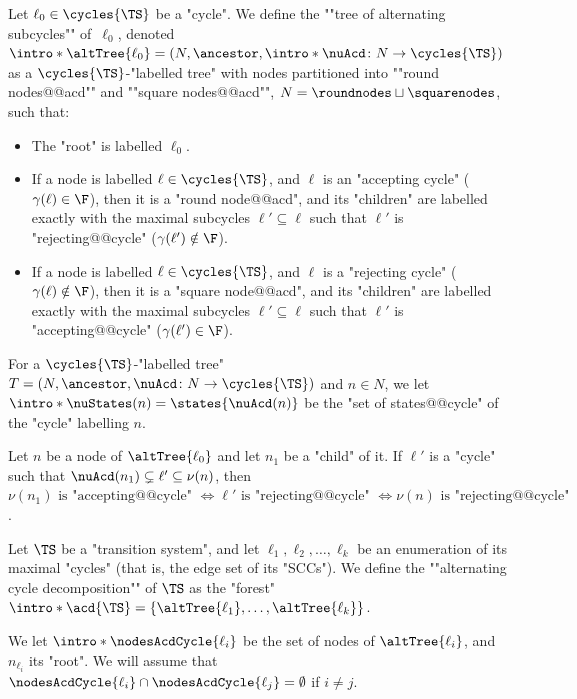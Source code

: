 \documentclass[10pt,a4paper]{amsart}
\renewcommand{\gg}{\gamma}
\begin{document}
\begin{definition}\label{def:tree_alternating_cycles}
	Let $\ell_0 \in \cycles{\TS}$ be a "cycle". 
	\AP We define the ""tree of alternating subcycles"" of~$\ell_0$, denoted $\intro*\altTree{\ell_0} = (N, \ancestor, \intro*\nuAcd\colon N \to \cycles{\TS})$ as a  $\cycles{\TS}$-"labelled tree" with nodes partitioned into ""round nodes@@acd"" and ""square nodes@@acd"", $N= \roundnodes \sqcup \squarenodes$, such that:
	\begin{itemize}
		\item The "root" is labelled $\ell_0$.
		\item If a node is labelled $\ell\in \cycles{\TS}$, and $\ell$ is an "accepting cycle" ($\gg(\ell)\in \F$), then it is a "round node@@acd", and its "children" are labelled exactly with the maximal subcycles $\ell' \subseteq \ell$ such that $\ell'$ is "rejecting@@cycle" ($\gg(\ell') \notin \F$).
		\item If a node is labelled $\ell\in \cycles{\TS}$, and $\ell$ is a "rejecting cycle" ($\gg(\ell)\notin \F$), then it is a "square node@@acd", and its "children" are labelled exactly with the maximal subcycles $\ell' \subseteq \ell$ such that $\ell'$ is "accepting@@cycle" ($\gg(\ell') \in \F$).
	\end{itemize}
\end{definition}


\AP For a $\cycles{\TS}$-"labelled tree" $T = (N, \ancestor, \nuAcd\colon N \to \cycles{\TS})$ and $n\in N$, we let $\intro*\nuStates(n) = \states{\nuAcd(n)}$ be the "set of states@@cycle" of the "cycle" labelling $n$. 

\begin{remark}\label{rmk-acd:union-changes-acceptance}
	Let $n$ be a node of $\altTree{\ell_0}$ and let $n_1$ be a "child" of it. If $\ell'$ is a "cycle" such that $\nuAcd(n_1) \subsetneq \ell' \subseteq \nu(n)$, then $\nu(n_1) \text{ is "accepting@@cycle" } \iff \ell' \text{ is "rejecting@@cycle" } \iff \nu(n) \text{ is "rejecting@@cycle"}$. 
\end{remark}


\begin{definition}\label{def:acd}
	\AP Let $\TS$ be a "transition system", and let $\ell_1, \ell_2, \dots, \ell_k$ be an enumeration of its maximal "cycles" (that is, the edge set of its "SCCs"). We define the ""alternating cycle decomposition"" of $\TS$ as  the "forest" $\intro*\acd{\TS} = \{\altTree{\ell_1},\dots, \altTree{\ell_k}\}$.
	
	We let $\intro*\nodesAcdCycle{\ell_i}$ be the set of nodes of $\altTree{\ell_i}$, and $n_{\ell_i}$ its "root". We will assume that $\nodesAcdCycle{\ell_i} \cap \nodesAcdCycle{\ell_j} = \emptyset$ if $i\neq j$.
\end{definition}
\end{document}
